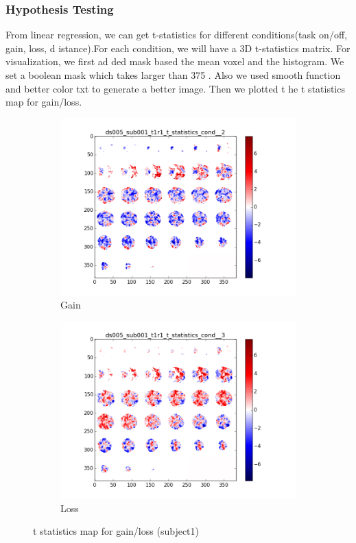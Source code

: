 \subsubsection {Hypothesis Testing}
From linear regression, we can get t-statistics for different conditions(task on/off, gain, loss, d
istance).For each condition, we will have a 3D t-statistics matrix. For visualization, we first ad
ded mask based the mean voxel and the histogram. We set a boolean mask which takes larger than 375
. Also we used smooth function and better color txt to generate a better image. Then we plotted t
he t statistics map for gain/loss. 
\begin{figure}[H]
\begin{subfigure}{.5\textwidth}
  \centering
  \includegraphics[width=.8\linewidth]{../fig/t_test/ds005_sub001_t1r1_t-test_cond2.png}
  \caption{Gain}
  \label{fig:sfig1}
\end{subfigure}%
\begin{subfigure}{.5\textwidth}
  \centering
  \includegraphics[width=.8\linewidth]{../fig/t_test/ds005_sub001_t1r1_t-test_cond3.png}
  \caption{Loss}
  \label{fig:sfig2}
\end{subfigure}
\caption{t statistics map for gain/loss (subject1)}
\label{fig:fig}
\end{figure}

